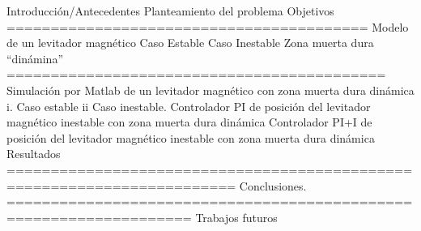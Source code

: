 Introducción/Antecedentes
Planteamiento del problema
Objetivos
=========================================
Modelo de un levitador magnético
Caso Estable
Caso Inestable
Zona muerta dura “dinámina”
===========================================
Simulación por Matlab de un levitador magnético con zona muerta dura dinámica
 i. Caso estable
 ii Caso inestable.
Controlador PI de posición del levitador magnético inestable con zona muerta dura dinámica
Controlador PI+I de posición del levitador magnético inestable con zona muerta dura dinámica
Resultados
========================================================================
Conclusiones.
===================================================================
Trabajos futuros

